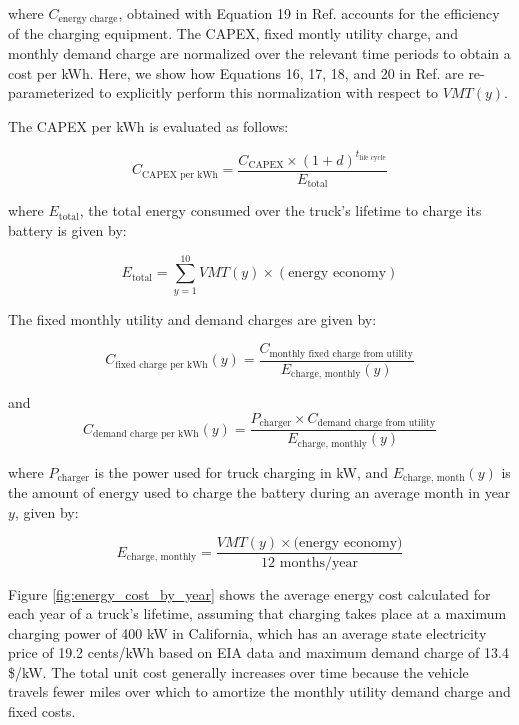 \noindent where $C_\text{energy charge}$, obtained with Equation 19 in Ref. \cite{Sader_2023} accounts for the efficiency of the charging equipment. The CAPEX, fixed montly utility charge, and monthly demand charge are normalized over the relevant time periods to obtain a cost per kWh. Here, we show how Equations 16, 17, 18, and 20 in Ref. \cite{Sader_2023} are re-parameterized to explicitly perform this normalization with respect to $VMT(y)$. 

The CAPEX per kWh is evaluated as follows:

\begin{equation}
    \label{eq:capex}
    C_\text{CAPEX per kWh} = \frac{C_\text{CAPEX}\times(1+d)^{t_\text{life cycle}}}{E_\text{total}}
\end{equation}

\noindent where $E_\text{total}$, the total energy consumed over the truck's lifetime to charge its battery is given by:

\begin{equation}
    \label{eq:E_total}
    E_\text{total} = \sum_{y=1}^{10} VMT(y) \times (\text{energy economy})
\end{equation}

The fixed monthly utility and demand charges are given by:

\begin{equation}
    \label{eq:monthly_charge}
    C_\text{fixed charge per kWh}(y) = \frac{C_\text{monthly fixed charge from utility}}{E_\text{charge, monthly}(y)}
\end{equation}

and
\begin{equation}
    \label{eq:monthly_charge}
    C_\text{demand charge per kWh}(y) = \frac{P_\text{charger}\times C_\text{demand charge from utility}}{E_\text{charge, monthly}(y)}
\end{equation}

\noindent where $P_\text{charger}$ is the power used for truck charging in kW, and $E_\text{charge, month}(y)$ is the amount of energy used to charge the battery during an average month in year $y$, given by:

\begin{equation}
    \label{eq:e_month}
    E_\text{charge, monthly} = \frac{VMT(y) \times (\text{energy economy)}}{12\text{ months/year}}
\end{equation}

Figure \ref{fig:energy_cost_by_year} shows the average energy cost calculated for each year of a truck's lifetime, assuming that charging takes place at a maximum charging power of 400 kW in California, which has an average state electricity price of 19.2 cents/kWh based on EIA data \cite{EIA_2024} and maximum demand charge of 13.4 \$/kW. The total unit cost generally increases over time because the vehicle travels fewer miles over which to amortize the monthly utility demand charge and fixed costs. 

